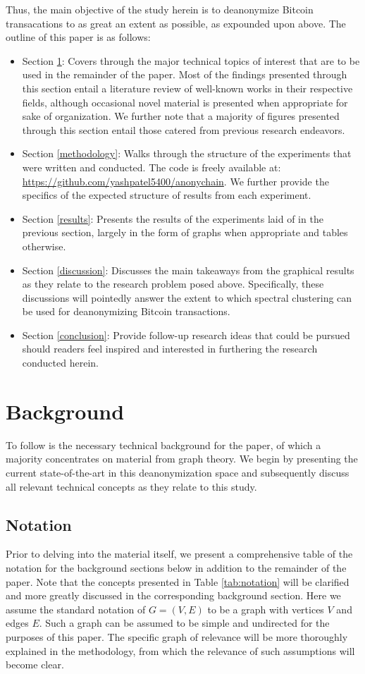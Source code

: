 \documentclass[journal]{IEEEtran}
\begin{document}
Thus, the main objective of the study herein is to deanonymize Bitcoin transacations to as great an extent as possible, as expounded upon above. The outline of this paper is as follows:
\begin{itemize}
    \item Section \ref{background}: Covers through the major technical topics of interest that are to be used in the remainder of the paper. Most of the findings presented through this section entail a literature review of well-known works in their respective fields, although occasional novel material is presented when appropriate for sake of organization. We further note that a majority of figures presented through this section entail those catered from previous research endeavors.
    \item Section \ref{methodology}: Walks through the structure of the experiments that were written and conducted. The code is freely available at: \url{https://github.com/yashpatel5400/anonychain}. We further provide the specifics of the expected structure of results from each experiment.
    \item Section \ref{results}: Presents the results of the experiments laid of in the previous section, largely in the form of graphs when appropriate and tables otherwise.
    \item Section \ref{discussion}: Discusses the main takeaways from the graphical results as they relate to the research problem posed above. Specifically, these discussions will pointedly answer the extent to which spectral clustering can be used for deanonymizing Bitcoin transactions.
    \item Section \ref{conclusion}: Provide follow-up research ideas that could be pursued should readers feel inspired and interested in furthering the research conducted herein.
\end{itemize}

\section{Background}\label{background}
To follow is the necessary technical background for the paper, of which a majority concentrates on material from graph theory. We begin by presenting the current state-of-the-art in this deanonymization space and subsequently discuss all relevant technical concepts as they relate to this study. 

\subsection{Notation}
Prior to delving into the material itself, we present a comprehensive table of the notation for the background sections below in addition to the remainder of the paper. Note that the concepts presented in Table \ref{tab:notation} will be clarified and more greatly discussed in the corresponding background section. Here we assume the standard notation of $G = (V,E)$ to be a graph with vertices $V$ and edges $E$. Such a graph can be assumed to be simple and undirected for the purposes of this paper. The specific graph of relevance will be more thoroughly explained in the methodology, from which the relevance of such assumptions will become clear.
\end{document}
